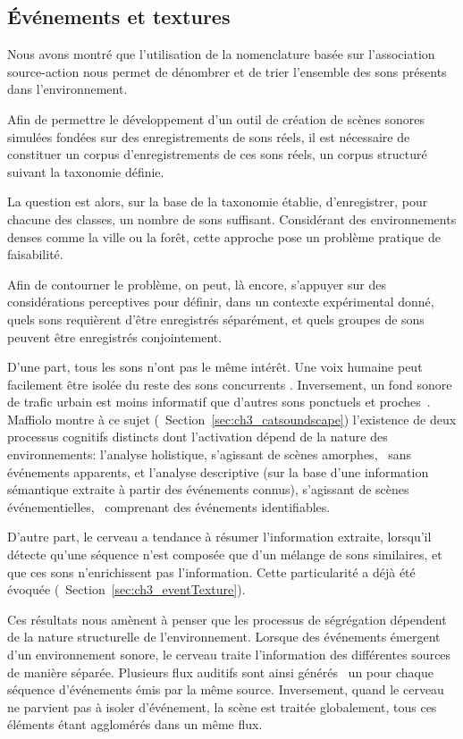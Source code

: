 \subsection{Événements et textures}
\label{sec:ch4_eventTextureAmorphe}

Nous avons montré que l'utilisation de la nomenclature basée sur l’association source-action nous permet de dénombrer et de trier l'ensemble des sons présents dans l'environnement.

Afin de permettre le développement d'un outil de création de scènes sonores simulées fondées sur des enregistrements de sons réels, il est nécessaire de constituer un corpus d'enregistrements de ces sons réels, un corpus structuré suivant la taxonomie définie. 

La question est alors, sur la base de la taxonomie établie, d'enregistrer, pour chacune des classes, un nombre de sons suffisant. Considérant des environnements denses comme la ville ou la forêt, cette approche pose un problème pratique de faisabilité.

Afin de contourner le problème, on peut, là encore, s’appuyer sur des considérations perceptives pour définir, dans un contexte expérimental donné, quels sons requièrent d'être enregistrés séparément, et quels groupes de sons peuvent être enregistrés conjointement.

D'une part, tous les sons n'ont pas le même intérêt. Une voix humaine peut facilement être isolée du reste des sons concurrents \citep{carlyon2004brain}. Inversement, un fond sonore de trafic urbain est moins informatif que d'autres sons ponctuels et proches~\citep{southworth1969sonic}.
Maffiolo montre à ce sujet (\cf~Section~\ref{sec:ch3_catsoundscape}) l'existence de deux processus cognitifs distincts dont l'activation dépend de la nature des environnements: l'analyse holistique, s'agissant de scènes amorphes, \ie~sans événements apparents, et l'analyse descriptive (sur la base d'une information sémantique extraite à partir des événements connus), s'agissant de scènes événementielles, \ie~comprenant des événements identifiables.

D'autre part, le cerveau a tendance à résumer l'information extraite, lorsqu'il détecte qu'une séquence n'est composée que d'un mélange de sons similaires, et que ces sons n'enrichissent pas l'information. Cette particularité a déjà été évoquée (\cf~Section~\ref{sec:ch3_eventTexture}). 

Ces résultats nous amènent à penser que les processus de ségrégation dépendent de la nature structurelle de l'environnement. Lorsque des événements émergent d'un environnement sonore, le cerveau traite l'information des différentes sources de manière séparée. Plusieurs flux auditifs sont ainsi générés \ie~un pour chaque séquence d'événements émis par la même source. Inversement, quand le cerveau ne parvient pas à isoler d'événement, la scène est traitée globalement, tous ces éléments étant agglomérés dans un même flux.

